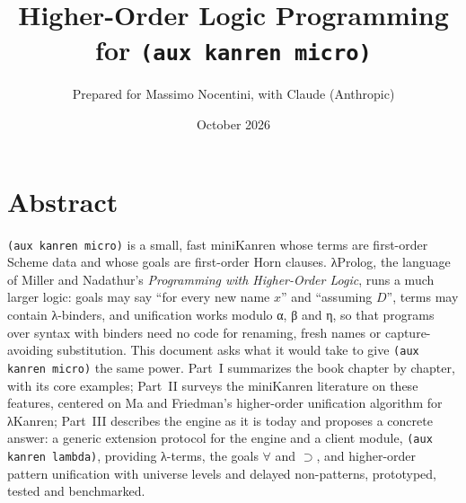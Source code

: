 \documentclass[a4paper,justified,nofonts,nobib,nols]{tufte-book}
\title[Higher-Order Logic Programming for (aux kanren micro)]%
  {Higher-Order Logic Programming for \mbox{\texttt{(aux kanren micro)}}}
\author[Prepared for Massimo Nocentini, with Claude (Anthropic)]%
  {Prepared for Massimo Nocentini, with Claude (Anthropic)}
\date{October 2026}
\begin{document}
\frontmatter

\begin{titlepage}
\begin{fullwidth}
\vspace*{0.12\textheight}
\vspace{2.5\baselineskip}
\vfill
{}
\vspace{0.6\baselineskip}
\vspace*{0.05\textheight}
\end{fullwidth}
\end{titlepage}

\chapter*{Abstract}
\noindent \texttt{(aux kanren micro)} is a small, fast miniKanren whose terms are first-order Scheme data and
whose goals are first-order Horn clauses. λProlog, the language of Miller and Nadathur's
\emph{Programming with Higher-Order Logic}, runs a much larger logic: goals may say \enquote{for every new
name $x$} and \enquote{assuming $D$}, terms may contain λ-binders, and unification works modulo α, β
and η, so that programs over syntax with binders need no code for renaming, fresh names or
capture-avoiding substitution. This document asks what it would take to give \texttt{(aux kanren micro)}
the same power. Part~I summarizes the book chapter by chapter, with its core examples; Part~II surveys
the miniKanren literature on these features, centered on Ma and Friedman's higher-order unification
algorithm for λKanren; Part~III describes the engine as it is today and proposes a concrete answer: a
generic extension protocol for the engine and a client module, \texttt{(aux kanren lambda)}, providing
λ-terms, the goals $\forall$ and $\supset$, and higher-order pattern unification with universe levels and
delayed non-patterns, prototyped, tested and benchmarked.
\end{document}
